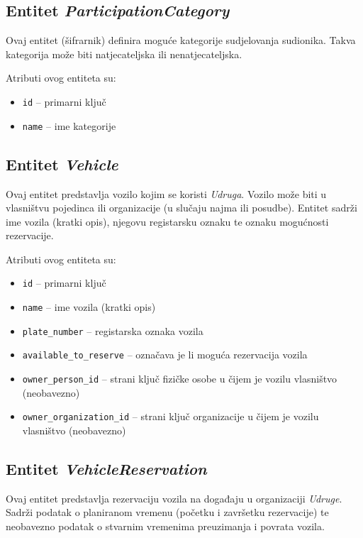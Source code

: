 \documentclass[times, utf8, diplomski]{fer}
\begin{document}
\subsection{Entitet \emph{ParticipationCategory}} \label{participation_category}

Ovaj entitet (šifrarnik) definira moguće kategorije sudjelovanja sudionika.
Takva kategorija može biti natjecateljska ili nenatjecateljska.

\medskip
Atributi ovog entiteta su:
\begin{itemize}
    \item \texttt{id} -- primarni ključ
    \item \texttt{name} -- ime kategorije
\end{itemize}

\subsection{Entitet \emph{Vehicle}} \label{vehicle}

Ovaj entitet predstavlja vozilo kojim se koristi \emph{Udruga}. Vozilo može biti
u vlasništvu pojedinca ili organizacije (u slučaju najma ili posudbe). Entitet
sadrži ime vozila (kratki opis), njegovu registarsku oznaku te oznaku mogućnosti
rezervacije.

\medskip
Atributi ovog entiteta su:
\begin{itemize}
    \item \texttt{id} -- primarni ključ
    \item \texttt{name} -- ime vozila (kratki opis)
    \item \texttt{plate\_number} -- registarska oznaka vozila
    \item \texttt{available\_to\_reserve} -- označava je li moguća rezervacija
        vozila
    \item \texttt{owner\_person\_id} -- strani ključ fizičke osobe u čijem je
        vozilu vlasništvo (neobavezno)
    \item \texttt{owner\_organization\_id} -- strani ključ organizacije u čijem
        je vozilu vlasništvo (neobavezno)
\end{itemize}

\subsection{Entitet \emph{VehicleReservation}} \label{vehicle_reservation}

Ovaj entitet predstavlja rezervaciju vozila na događaju u organizaciji
\emph{Udruge}. Sadrži podatak o planiranom vremenu (početku i završetku
rezervacije) te neobavezno podatak o stvarnim vremenima preuzimanja i povrata
vozila.
\end{document}
